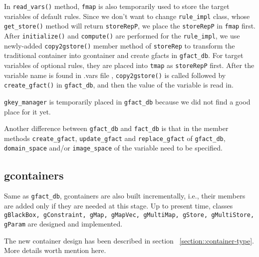 \documentclass{article}
\begin{document}
 
 

 In \texttt{read\_vars()} method, \texttt{fmap}
  is also temporarily used to store the target variables of default
 rules. Since we don't want to change \texttt{rule\_impl} class, whose
 \texttt{get\_store()} method will return \texttt{storeRepP}, we
 place the \texttt{storeRepP} in  \texttt{fmap} first. After \texttt{initialize()}
 and \texttt{compute()} are performed for the \texttt{rule\_impl}, we
 use newly-added \texttt{copy2gstore()} member method of
 \texttt{storeRep} 
 to transform the traditional container into gcontainer
 and create gfacts in \texttt{gfact\_db}.  For target variables of
 optional rules, they are placed into \texttt{tmap} as \texttt{storeRepP} first. After the
 variable name is found in .vars file ,  \texttt{copy2gstore()} is
 called followed by \texttt{create\_gfact()} in \texttt{gfact\_db}, and
 then the value of the variable is read in. 
 
 \texttt{gkey\_manager} is temporarily placed in \texttt{gfact\_db} because we did not
 find a good place for it yet. 

Another difference between \texttt{gfact\_db} and \texttt{fact\_db} is
that in the member methods \texttt{create\_gfact}, \texttt{update\_gfact}
and \texttt{replace\_gfact} of \texttt{gfact\_db}, \texttt{domain\_space} and/or
\texttt{image\_space} of the variable need to be specified.

 
\subsection{gcontainers} 
Same as \texttt{gfact\_db}, gcontainers are also built incrementally,
i.e., their members are added only if they are needed at this
stage. Up to present time, classes \texttt{gBlackBox, gConstraint, gMap,
  gMapVec, gMultiMap, gStore, gMultiStore, gParam} are designed and
implemented.
 

The new container design has been described in section
~\ref{section::container-type}. More details worth mention here.
\end{document}
